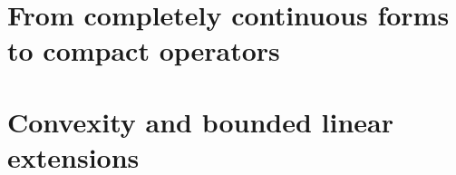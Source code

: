 \documentclass[12pt,b5paper,notitlepage]{article}
\theoremstyle{definition}
\theoremstyle{plain}
\numberwithin{equation}{section}
\begin{document}
\newpage



\section{From completely continuous forms to compact operators}\label{lb355}


\newpage

\section{Convexity and bounded linear extensions}





\printindex	
\end{document}
